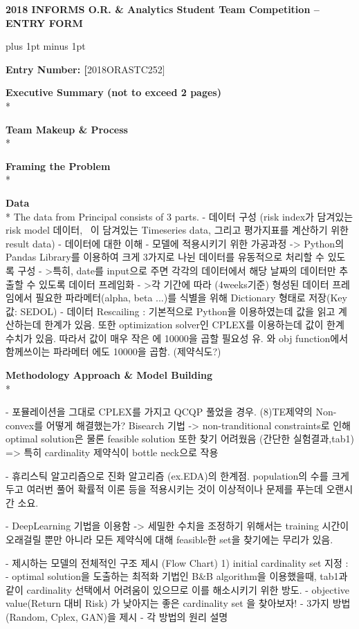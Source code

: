 \documentclass[11pt]{article}
\begin{document}
\centerline{\textbf{2018 INFORMS O.R. {\&} Analytics Student Team Competition -- ENTRY FORM}}

\baselineskip16pt plus 1pt minus 1pt


\textbf{Entry Number: [}2018ORASTC252]

\textbf{Executive Summary (not to exceed 2 pages)}\\*


\textbf{Team Makeup {\&} Process}\\*

\textbf{Framing the Problem}\\*



\textbf{Data}\\*
The data from Principal consists of 3 parts.
- 데이터 구성 (risk index가 담겨있는 risk model 데이터, ~이 담겨있는 Timeseries data, 그리고 평가지표를 계산하기 위한 result data)
- 데이터에 대한 이해
- 모델에 적용시키기 위한 가공과정 
		-> Python의 Pandas Library를 이용하여 크게 3가지로 나뉜 데이터를 유동적으로 처리할 수 있도록 구성
		- >특히, date를 input으로 주면 각각의 데이터에서 해당 날짜의 데이터만 추출할 수 있도록 데이터 프레임화
		- >각 기간에 따라 (4weeks기준) 형성된 데이터 프레임에서 필요한 파라메터(alpha, beta ...)를 식별을 위해 Dictionary 형태로 저장(Key값: SEDOL)
- 데이터 Rescailing : 기본적으로 Python을 이용하였는데 값을 읽고 계산하는데 한계가 있음. 또한 optimization solver인 CPLEX를 이용하는데 값이 한계 수치가 있음. 따라서 값이 매우 작은 \omega 에 10000을 곱할 필요성 유. \omega 와 obj function에서 함께쓰이는 파라메터 \alpha 에도 10000을 곱함. (제약식도?)


\textbf{Methodology Approach {\&} Model Building}\\*

- 포뮬레이션을 그대로 CPLEX를 가지고 QCQP 풀었을 경우. (8)TE제약의 Non-convex를 어떻게 해결했는가? Bisearch 기법
	 -> non-tranditional constraints로 인해 optimal solution은 물론 feasible solution 또한 찾기 어려웠음 (간단한 실험결과,tab1) => 특히 cardinality 제약식이 bottle neck으로 작용

- 휴리스틱 알고리즘으로 진화 알고리즘 (ex.EDA)의 한계점. population의 수를 크게 두고 여러번 풀어 확률적 이론 등을 적용시키는 것이 이상적이나 문제를 푸는데 오랜시간 소요.

- DeepLearning 기법을 이용함 -> 세밀한 수치을 조정하기 위해서는 training 시간이 오래걸릴 뿐만 아니라 모든 제약식에 대해 feasible한 set을 찾기에는 무리가 있음. 


- 제시하는 모델의 전체적인 구조 제시 (Flow Chart)
	1) initial cardinality set 지정 : 
		- optimal solution을 도출하는 최적화 기법인 B&B algorithm을 이용했을때, tab1과 같이 cardinality 선택에서 어려움이 있으므로 이를 해소시키기 위한 방도. 
		- objective value(Return 대비 Risk) 가 낮아지는 좋은 cardinality set 을 찾아보자!
		- 3가지 방법(Random, Cplex, GAN)을 제시
		- 각 방법의 원리 설명
\end{document}

